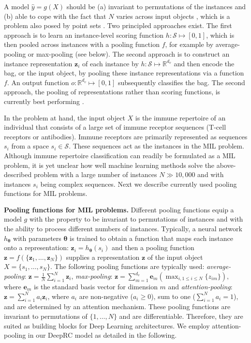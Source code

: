 \documentclass[oneside]{book}
\newcommand\Bz{\bm{z}}
\renewcommand{\leq}{\leqslant}
\begin{document}
A model $\hat y = g(X)$ should be 
(a) invariant to permutations of the instances and 
(b) able to cope with the fact that $N$ varies across input objects \citep{ilse2018attention}, which
is a problem also posed by point sets \citep{qi2017pointnet}. 
Two principled approaches exist. The first approach is to learn an instance-level
scoring function $h:\mathcal S \mapsto [0,1]$, which is then pooled 
across instances with a pooling function $f$, 
for example by average-pooling or max-pooling (see below).
The second approach is to construct an instance representation $\Bz_i$ of each instance by 
$h:\mathcal S \mapsto \mathbb R^{d_v}$ and then 
encode the bag, or the input object, 
by pooling these instance representations \citep{wang2018revisiting}
via a function $f$. 
An output function $o:\mathbb R^{d_v} \mapsto [0,1]$ subsequently classifies the bag. 
The second approach, the pooling of representations rather than scoring functions, is currently best performing \citep{wang2018revisiting}.
%

In the problem at hand, the input object $X$ is the 
immune repertoire of an individual that consists of a large set of 
immune receptor sequences (T-cell receptors or antibodies). 
Immune receptors are primarily 
represented as sequences $s_i$ from a space $s_i \in \mathcal S$.
These sequences act as the instances in the MIL problem. 
%
Although immune repertoire classification can readily be 
formulated as a MIL problem,
it is yet unclear how well machine learning 
methods solve the above-described problem with 
a large number of instances $N \gg 10,000$ and with 
instances $s_i$ being complex sequences.
Next we describe currently used
pooling functions for MIL problems.



\textbf{Pooling functions for MIL problems.} 
Different pooling functions equip a model $g$ with the property 
to be invariant to permutations of instances and with the ability 
to process different numbers of instances. 
Typically, a neural network $h_{\bm \theta}$ 
with parameters $\bm \theta$ is trained 
to obtain a function that maps each instance onto a representation:
$\bm z_i = h_{\bm \theta}(s_i)$ and then a pooling function
$\Bz=f(\{\Bz_1,\ldots,\Bz_N\})$ supplies a 
representation $\Bz$ of the input object $X=\{s_1,\ldots,s_{N}\}$.
The following pooling functions are typically used:
%
\emph{average-pooling}: $\bm z=\frac{1}{N}\sum_{i=1}^{N} \bm z_i$,
%
\emph{max-pooling}: $\bm z= \sum_{m=1}^{d_v} \bm e_m (\max_{i, 1\leq i \leq N} \{ z_{im} \}),$
    where $\bm e_m$ is the standard basis vector for dimension $m$ 
    and
%
\emph{attention-pooling}: $\bm z=\sum_{i=1}^{N} a_i \bm z_i$,
where $a_i$ are non-negative ($a_i\geq0$), sum to one  ($\sum_{i=1}^{N} a_i=1$), and are determined by an attention mechanism.
%
These pooling functions are invariant to permutations of $\{1,\dots,N\}$ 
and are differentiable.
Therefore, they are suited as building blocks 
for Deep Learning architectures. 
%
We employ attention-pooling in our DeepRC model as detailed
in the following.
\end{document}
